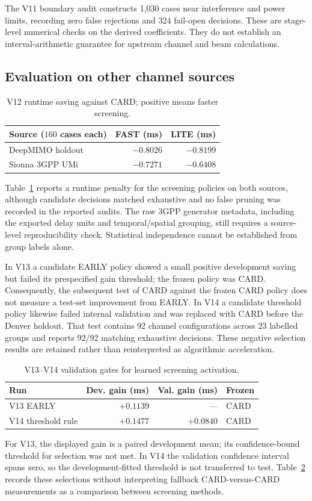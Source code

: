 \documentclass[journal]{IEEEtran}
\begin{document}
The V11 boundary audit constructs 1,030 cases near interference and power limits, recording zero false rejections and 324 fail-open decisions. These are stage-level numerical checks on the derived coefficients. They do not establish an interval-arithmetic guarantee for upstream channel and beam calculations.

\subsection{Evaluation on other channel sources}
\begin{table}[t]
\caption{V12 runtime saving against CARD; positive means faster screening.}
\label{tab:v12}\centering\footnotesize
\begin{tabular}{lrr}\toprule
Source ($160$ cases each) & FAST (ms) & LITE (ms)\\\midrule
DeepMIMO holdout & $-0.8026$ & $-0.8199$\\
Sionna 3GPP UMi & $-0.7271$ & $-0.6408$\\\bottomrule
\end{tabular}
\end{table}
Table~\ref{tab:v12} reports a runtime penalty for the screening policies on both sources, although candidate decisions matched exhaustive and no false pruning was recorded in the reported audits. The raw 3GPP generator metadata, including the exported delay units and temporal/spatial grouping, still requires a source-level reproducibility check. Statistical independence cannot be established from group labels alone.

In V13 a candidate EARLY policy showed a small positive development saving but failed its prespecified gain threshold; the frozen policy was CARD. Consequently, the subsequent test of CARD against the frozen CARD policy does not measure a test-set improvement from EARLY. In V14 a candidate threshold policy likewise failed internal validation and was replaced with CARD before the Denver holdout. That test contains 92 channel configurations across 23 labelled groups and reports 92/92 matching exhaustive decisions. These negative selection results are retained rather than reinterpreted as algorithmic acceleration.

\begin{table}[t]
\caption{V13--V14 validation gates for learned screening activation.}
\label{tab:selection}\centering\footnotesize
\begin{tabular}{lrrl}\toprule
Run & Dev. gain (ms) & Val. gain (ms) & Frozen\\\midrule
V13 EARLY & $+0.1139$ & --- & CARD\\
V14 threshold rule & $+0.1477$ & $+0.0840$ & CARD\\\bottomrule
\end{tabular}
\end{table}
For V13, the displayed gain is a paired development mean; its confidence-bound threshold for selection was not met. In V14 the validation confidence interval spans zero, so the development-fitted threshold is not transferred to test. Table~\ref{tab:selection} records these selections without interpreting fallback CARD-versus-CARD measurements as a comparison between screening methods.
\end{document}
